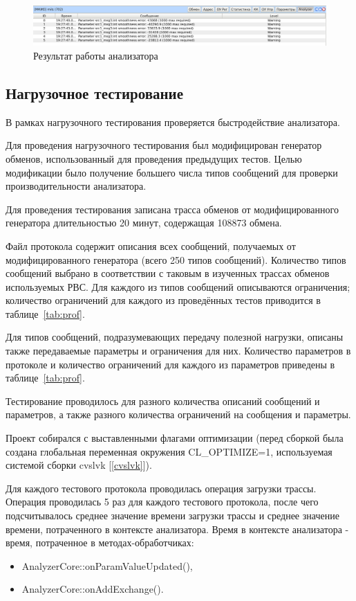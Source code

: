 \begin{figure}[H]
 \centering
 \includegraphics[scale=0.4]{tests/param_smooth/report}
 \caption{Результат работы анализатора}
 \label{fig:param_smooth_report}
\end{figure}

\subsection{Нагрузочное тестирование}

В рамках нагрузочного тестирования проверяется быстродействие анализатора.

Для проведения нагрузочного тестирования был модифицирован генератор обменов, 
использованный для проведения предыдущих тестов. Целью модификации было 
получение большего числа типов сообщений для проверки производительности 
анализатора.

Для проведения тестирования записана трасса обменов от 
модифицированного генератора длительностью 20 минут, содержащая 108873 обмена. 

Файл протокола содержит описания всех сообщений, получаемых от 
модифицированного генератора (всего 250 типов сообщений). Количество типов 
сообщений выбрано в соответствии с таковым в изученных трассах обменов 
используемых РВС. Для каждого из типов сообщений описываются ограничения; 
количество ограничений для каждого из проведённых тестов приводится в 
таблице~\ref{tab:prof}.

Для типов сообщений, подразумевающих передачу полезной нагрузки, описаны также 
передаваемые параметры и ограничения для них. Количество параметров в протоколе 
и количество ограничений для каждого из параметров приведены в 
таблице~\ref{tab:prof}.

Тестирование проводилось для разного количества описаний сообщений и 
параметров, а также разного количества ограничений на сообщения и параметры.

Проект собирался с выставленными флагами оптимизации (перед сборкой была 
создана глобальная переменная окружения CL\_OPTIMIZE=1, используемая системой 
сборки cvslvk [\ref{cvslvk}]).

Для каждого тестового протокола проводилась операция загрузки трассы. Операция 
проводилась 5 раз для каждого тестового протокола, после чего подсчитывалось 
среднее значение времени загрузки трассы и среднее значение времени, 
потраченного в контексте анализатора. Время в контексте анализатора - время, 
потраченное в методах-обработчиках:
\begin{itemize}
 \item AnalyzerCore::onParamValueUpdated(),
 \item AnalyzerCore::onAddExchange(). 
\end{itemize}

